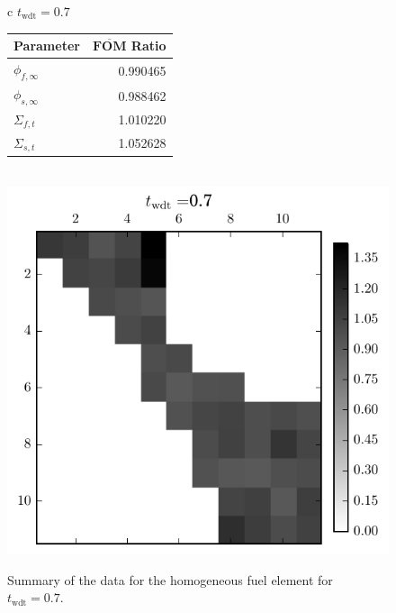 \begin{figure}[hbtp]
  \centering
  \begin{tabular}{c} $t_{\mathrm{wdt}}=0.7$\\
  \begin{tabular}{lr}\toprule
    \textbf{Parameter}& $\overline{\mathbf{FOM}}$ \textbf{Ratio} \\ \midrule
    $\phi_{f, \infty}$ & 0.990465\\
    $\phi_{s, \infty}$ & 0.988462 \\
    $\Sigma_{f,t}$ & 1.010220 \\
    $\Sigma_{s,t}$ & 1.052628 \\
    \bottomrule
  \end{tabular}\\
    \includegraphics[scale=0.75]{images/results/matshows/homog_sp0_matshow_6}
\end{tabular}
  \caption{Summary of the data for the homogeneous fuel element for $t_{\mathrm{wdt}} = 0.7$.}
\label{fig:homog_summary}
\end{figure}



